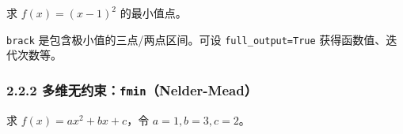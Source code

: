 求 \(f(x)=(x-1)^2\) 的最小值点。

\begin{Shaded}
\begin{Highlighting}[]
\OperatorTok{{-}}\NormalTok{)}\OperatorTok{**}\OperatorTok{=}\NormalTok{(}\NormalTok{, }\NormalTok{)))}
\end{Highlighting}
\end{Shaded}

\begin{Shaded}
\begin{Highlighting}[]
\end{Highlighting}
\end{Shaded}

\texttt{brack} 是包含极小值的三点/两点区间。可设
\texttt{full\_output=True} 获得函数值、迭代次数等。

\subsubsection{\texorpdfstring{2.2.2
多维无约束：\texttt{fmin}（Nelder-Mead）}{2.2.2 多维无约束：fmin（Nelder-Mead）}}\label{ux591aux7ef4ux65e0ux7ea6ux675ffminnelder-mead}

求 \(f(x)=ax^2+bx+c\)，令 \(a=1,b=3,c=2\)。

\begin{Shaded}
\begin{Highlighting}[]

    \OperatorTok{*}\OperatorTok{**} \OperatorTok{+}\OperatorTok{*}\OperatorTok{+}

\OperatorTok{=}\NormalTok{ fmin(quadratic, np.array([}\NormalTok{]), args}\OperatorTok{=}\NormalTok{(}\NormalTok{, }\NormalTok{, }\OperatorTok{=}\OperatorTok{=}\NormalTok{)}
\NormalTok{(}\NormalTok{, res[}\NormalTok{], }\NormalTok{, res[}\NormalTok{], }\NormalTok{, res[}\NormalTok{], }\NormalTok{, res[}\NormalTok{])}
\end{Highlighting}
\end{Shaded}

